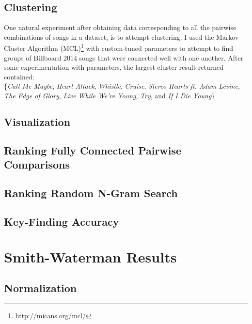 
\subsection{Clustering}

One natural experiment after obtaining data corresponding to all the pairwise combinations of songs in a dataset, is to attempt clustering. I used the Markov Cluster Algorithm (MCL)\footnote{http://micans.org/mcl/} with custom-tuned parameters to attempt to find groups of Billboard 2014 songs that were connected well with one another. After some experimentation with parameters, the largest cluster result returned contained:\\

\{\textit{Call Me Maybe}, \textit{Heart Attack}, \textit{Whistle}, \textit{Cruise}, \textit{Stereo Hearts ft. Adam Levine}, \textit{The Edge of Glory}, \textit{Live While We're Young}, \textit{Try}, and \textit{If I Die Young}\}

\subsection{Visualization}

\subsection{Ranking Fully Connected Pairwise Comparisons}

\subsection{Ranking Random N-Gram Search}

\subsection{Key-Finding Accuracy}

\section{Smith-Waterman Results}

\subsection{Normalization}

